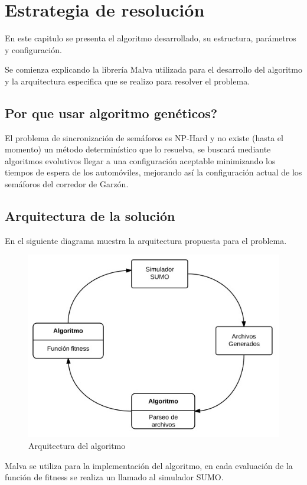 \chapter{Estrategia de resolución}

En este capitulo se presenta el algoritmo desarrollado, su estructura, parámetros y configuración. 

Se comienza explicando la librería Malva utilizada para el desarrollo del algoritmo y la arquitectura especifica que se realizo para resolver el problema.

\section{Por que usar algoritmo genéticos?}
El problema de sincronización de semáforos es NP-Hard y 
no existe (hasta el momento) un método determinístico que lo
resuelva, se buscará mediante algoritmos evolutivos llegar a
una configuración aceptable minimizando los tiempos de
espera de los automóviles, mejorando así la configuración
actual de los semáforos del corredor de Garzón.


\section{Arquitectura de la solución}

En el siguiente diagrama muestra la arquitectura propuesta para el problema.

\begin{figure}[H]
\centering
\includegraphics[width=0.7\linewidth]{Figures/arquitectura1}
\caption{Arquitectura del algoritmo}
\label{fig:arquitectura1}
\end{figure}


Malva se utiliza para la implementación del algoritmo, en cada evaluación de la función de fitness se realiza un llamado al simulador SUMO. 

